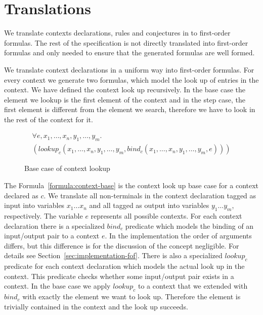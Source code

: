 \section{Translations}
\label{sec:translations}
We translate contexts declarations, rules and conjectures in to
first-order formulas. The rest of the specification is not directly
translated into first-order formulas and only needed to ensure that
the generated formulas are well formed.


We translate context declarations in a uniform way into first-order
formulas. For every context we generate two formulas, which model the
look up of entries in the context. We have defined the context look
up recursively. In the base case the element we lookup is the first
element of the context and in the step case, the first element is
different from the element we search, therefore we have to look in the
rest of the context for it.

\begin{figure}
\begin{multline}
  \forall e, x_1, \dots, x_n, y_1, \dots, y_m . \\
  (lookup_c(x_1,\dots,x_n,y_1,\dots,y_m,
  bind_c(x_1,\dots,x_n,y_1,\dots,y_m,e)))
\label{formula:context-base}
\end{multline}
\caption{Base case of context lookup}
\end{figure}

The Formula~\ref{formula:context-base} is the context look up base
case for a context declared as $c$. We translate all non-terminals in
the context declaration tagged as input into variables $x_1 \dots x_n$
and all tagged as output into variables $y_1 \dots y_m$,
respectively. The variable $e$ represents all possible contexts. For
each context declaration there is a specialized $bind_c$ predicate
which models the binding of an input/output pair to a context $e$. In
the implementation the order of arguments differs, but this difference
is for the discussion of the concept negligible. For details see
Section~\ref{sec:implementation-fof}. There is also a specialized
$lookup_c$ predicate for each context declaration which models the
actual look up in the context. This predicate checks whether some
input/output pair exists in a context. In the base case we apply
$lookup_c$ to a context that we extended with $bind_c$ with exactly
the element we want to look up. Therefore the element is trivially
contained in the context and the look up succeeds.

